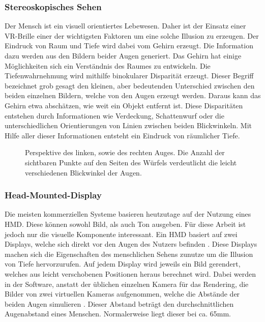 \subsubsection{Stereoskopisches Sehen}


Der Mensch ist ein visuell orientiertes Lebewesen. Daher ist der Einsatz einer VR-Brille einer der wichtigsten
Faktoren um eine solche Illusion zu erzeugen. Der Eindruck von Raum und Tiefe wird dabei vom Gehirn erzeugt.
Die Information dazu werden aus den Bildern beider Augen generiert.
Das Gehirn hat einige Möglichkeiten sich ein Verständnis des Raumes zu entwickeln.
Die Tiefenwahrnehmung wird mithilfe binokularer Disparität erzeugt. Dieser Begriff bezeichnet grob gesagt den kleinen, aber bedeutenden
Unterschied zwischen den beiden einzelnen Bildern, welche von den Augen erzeugt werden. Daraus kann das Gehirn etwa
abschätzen, wie weit ein Objekt entfernt ist.
Diese Disparitäten entstehen durch Informationen wie Verdeckung, Schattenwurf oder die unterschiedlichen Orientierungen von Linien zwischen
beiden Blickwinkeln. \parencite{Tauer2010}
Mit Hilfe aller dieser Informationen entsteht ein Eindruck von räumlicher Tiefe.

\begin{figure}[h]
	\centering
	\begin{footnotesize}
		\caption{Perspektive des linken, sowie des rechten Auges. Die Anzahl der sichtbaren Punkte auf den Seiten des Würfels verdeutlicht die leicht verschiedenen Blickwinkel der Augen.}
	\end{footnotesize}
\end{figure}


\subsubsection{Head-Mounted-Display}
Die meisten kommerziellen Systeme basieren heutzutage auf der Nutzung eines HMD.
Diese können sowohl Bild, als auch Ton ausgeben. Für diese Arbeit ist jedoch nur die visuelle Komponente interessant.
Ein HMD basiert auf zwei Displays, welche sich direkt vor den Augen des Nutzers befinden \parencite{Sutherland1968}.
Diese Displays machen sich die Eigenschaften des menschlichen Sehens zunutze um die Illusion von Tiefe hervorzurufen.
Auf jedem Display wird jeweils ein Bild gerendert, welches aus leicht verschobenen Positionen heraus berechnet wird.
Dabei werden in der Software, anstatt der üblichen einzelnen Kamera für das Rendering, die Bilder von zwei virtuellen Kameras aufgenommen,
welche die Abstände der beiden Augen simulieren \parencite{NVIDIA2010}. Dieser Abstand beträgt den durchschnittlichen
Augenabstand eines Menschen. Normalerweise liegt dieser bei ca. 65mm.

